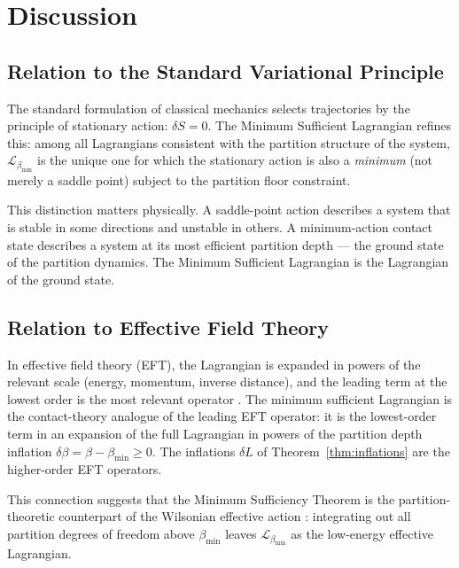 \documentclass[11pt,twocolumn,a4paper]{article}
\theoremstyle{plain}
\theoremstyle{definition}
\theoremstyle{remark}
\newcommand{\bmin}{\beta_{\min}}
\newcommand{\Lmin}{\mathcal{L}_{\bmin}}
\begin{document}
\section{Discussion}
\label{sec:discussion}

\subsection{Relation to the Standard Variational Principle}

The standard formulation of classical mechanics selects trajectories by the
principle of stationary action: $\delta S = 0$. The Minimum Sufficient
Lagrangian refines this: among all Lagrangians consistent with the partition
structure of the system, $\Lmin$ is the unique one for which the stationary
action is also a \emph{minimum} (not merely a saddle point) subject to the
partition floor constraint.

This distinction matters physically. A saddle-point action describes a system
that is stable in some directions and unstable in others. A minimum-action
contact state describes a system at its most efficient partition depth ---
the ground state of the partition dynamics. The Minimum Sufficient Lagrangian
is the Lagrangian of the ground state.

\subsection{Relation to Effective Field Theory}

In effective field theory (EFT), the Lagrangian is expanded in powers of the
relevant scale (energy, momentum, inverse distance), and the leading term at
the lowest order is the most relevant operator \citep{georgi1994effective}.
The minimum sufficient Lagrangian is the contact-theory analogue of the leading
EFT operator: it is the lowest-order term in an expansion of the full Lagrangian
in powers of the partition depth inflation $\delta\beta = \beta - \bmin \geq 0$.
The inflations $\delta L$ of Theorem~\ref{thm:inflations} are the higher-order
EFT operators.

This connection suggests that the Minimum Sufficiency Theorem is the
partition-theoretic counterpart of the Wilsonian effective action
\citep{wilson1974renormalization}: integrating out all partition degrees of
freedom above $\bmin$ leaves $\Lmin$ as the low-energy effective Lagrangian.
\end{document}
